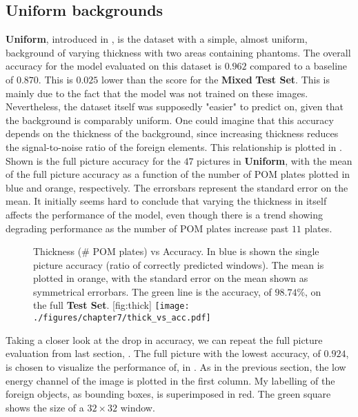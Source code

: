 \subsection{Uniform backgrounds}
\label{sec:sanity}
\textbf{Uniform}, introduced in , is the dataset with a simple, almost uniform, background of varying thickness with two areas containing phantoms. 
The overall accuracy for the model evaluated on this dataset is $0.962$ compared to a baseline of $0.870$. 
This is $0.025$ lower than the score for the \textbf{Mixed} \textbf{Test Set}.
This is mainly due to the fact that the model was not trained on these images. 
Nevertheless, the dataset itself was supposedly "easier" to predict on, given that the background is comparably uniform.
One could imagine that this accuracy depends on the thickness of the background, since increasing thickness reduces the signal-to-noise ratio of the foreign elements.
This relationship is plotted in .
Shown is the full picture accuracy for the $47$ pictures in \textbf{Uniform}, with the mean of the full picture accuracy as a function of the number of POM plates plotted in blue and orange, respectively. The errorsbars represent the standard error on the mean. It initially seems hard to conclude that varying the thickness in itself affects the performance of the model, even though there is a trend showing degrading performance as the number of POM plates increase past $11$ plates. 

\begin{figure}[h]
	\begin{sidecaption}{Thickness (\# POM plates) vs Accuracy. In blue is shown the single picture accuracy (ratio of correctly predicted windows). The mean is plotted in orange, with the standard error on the mean shown as symmetrical errorbars. The green line is the accuracy, of $98.74 \%$, on the full \textbf{Test Set}. }[fig:thick]
		\texttt{[image: ./figures/chapter7/thick\_vs\_acc.pdf]}
	\end{sidecaption}
\end{figure}

Taking a closer look at the drop in accuracy, we can repeat the full picture evaluation from last section, . 
The full picture with the lowest accuracy, of $0.924$, is chosen to visualize the performance of, in .
As in the previous section, the low energy channel of the image is plotted in the first column. My labelling of the foreign objects, as bounding boxes, is superimposed in red. The green square shows the size of a $32 \times 32$ window.


